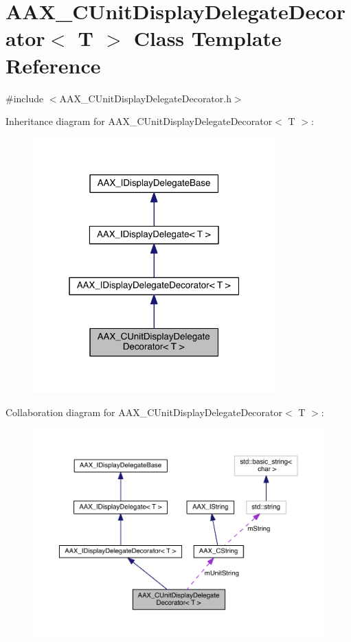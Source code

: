 \hypertarget{a00045}{}\section{A\+A\+X\+\_\+\+C\+Unit\+Display\+Delegate\+Decorator$<$ T $>$ Class Template Reference}
\label{a00045}


{\ttfamily \#include $<$A\+A\+X\+\_\+\+C\+Unit\+Display\+Delegate\+Decorator.\+h$>$}



Inheritance diagram for A\+A\+X\+\_\+\+C\+Unit\+Display\+Delegate\+Decorator$<$ T $>$\+:
\nopagebreak
\begin{figure}[H]
\begin{center}
\leavevmode
\includegraphics[width=265pt]{a00480}
\end{center}
\end{figure}


Collaboration diagram for A\+A\+X\+\_\+\+C\+Unit\+Display\+Delegate\+Decorator$<$ T $>$\+:
\nopagebreak
\begin{figure}[H]
\begin{center}
\leavevmode
\includegraphics[width=350pt]{a00481}
\end{center}
\end{figure}


